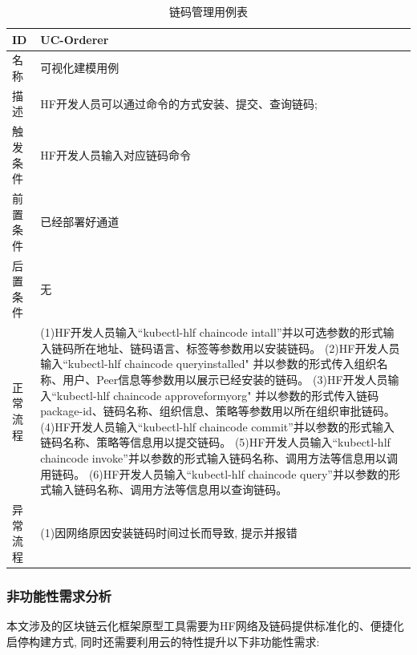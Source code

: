 {\footnotesize
\begin{longtable}[h]{m{60pt}|m{280pt}}
    \caption[链码管理用例表]{链码管理用例表} \label{cc_use_case} \\
        \hline  
        ID&UC-Orderer\\
        \hline
        名称&可视化建模用例\\
        \hline
        描述&HF开发人员可以通过命令的方式安装、提交、查询链码;\\
        \hline
        触发条件&HF开发人员输入对应链码命令\\
        \hline
        前置条件&已经部署好通道\\
        \hline
        后置条件&无\\
        \hline
        正常流程& (1)HF开发人员输入“kubectl-hlf chaincode intall”并以可选参数的形式输入链码所在地址、链码语言、标签等参数用以安装链码。
        \newline (2)HF开发人员输入“kubectl-hlf chaincode queryinstalled" 并以参数的形式传入组织名称、用户、Peer信息等参数用以展示已经安装的链码。
         \newline (3)HF开发人员输入“kubectl-hlf chaincode approveformyorg" 并以参数的形式传入链码package-id、链码名称、组织信息、策略等参数用以所在组织审批链码。
        \newline (4)HF开发人员输入“kubectl-hlf chaincode commit”并以参数的形式输入链码名称、策略等信息用以提交链码。
        \newline (5)HF开发人员输入“kubectl-hlf chaincode invoke”并以参数的形式输入链码名称、调用方法等信息用以调用链码。
        \newline (6)HF开发人员输入“kubectl-hlf chaincode query”并以参数的形式输入链码名称、调用方法等信息用以查询链码。\\
        \hline 
        异常流程& (1)因网络原因安装链码时间过长而导致, 提示并报错\\
        \hline
    \end{longtable} 
}



\subsubsection{非功能性需求分析}

本文涉及的区块链云化框架原型工具需要为HF网络及链码提供标准化的、便捷化启停构建方式, 同时还需要利用云的特性提升以下非功能性需求:

